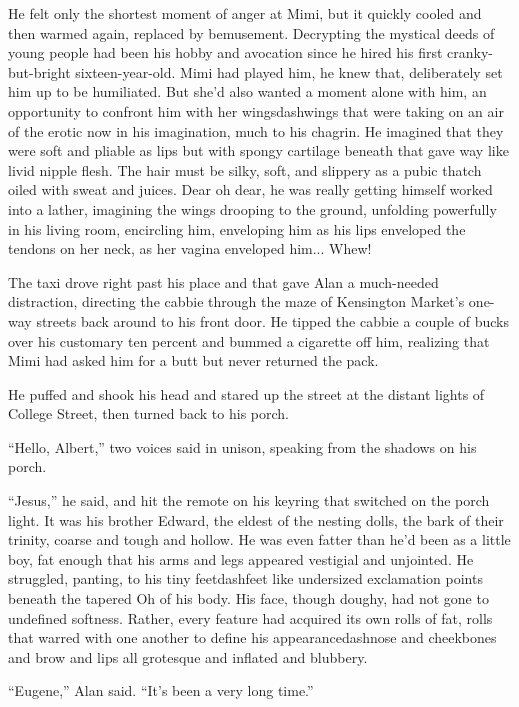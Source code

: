 He felt only the shortest moment of anger at Mimi, but it quickly
cooled and then warmed again, replaced by bemusement.  Decrypting the
mystical deeds of young people had been his hobby and avocation since
he hired his first cranky-but-bright sixteen-year-old.  Mimi had
played him, he knew that, deliberately set him up to be humiliated. 
But she'd also wanted a moment alone with him, an opportunity to
confront him with her wingsdash{}wings that were taking on an air of the
erotic now in his imagination, much to his chagrin.  He imagined that
they were soft and pliable as lips but with spongy cartilage beneath
that gave way like livid nipple flesh.  The hair must be silky, soft,
and slippery as a pubic thatch oiled with sweat and juices.  Dear oh
dear, he was really getting himself worked into a lather, imagining
the wings drooping to the ground, unfolding powerfully in his living
room, encircling him, enveloping him as his lips enveloped the tendons
on her neck, as her vagina enveloped him...  Whew!

The taxi drove right past his place and that gave Alan a much-needed
distraction, directing the cabbie through the maze of Kensington
Market's one-way streets back around to his front door.  He tipped the
cabbie a couple of bucks over his customary ten percent and bummed a
cigarette off him, realizing that Mimi had asked him for a butt but
never returned the pack.

He puffed and shook his head and stared up the street at the distant
lights of College Street, then turned back to his porch.

``Hello, Albert,'' two voices said in unison, speaking from the
shadows on his porch.

``Jesus,'' he said, and hit the remote on his keyring that switched on
the porch light.  It was his brother Edward, the eldest of the nesting
dolls, the bark of their trinity, coarse and tough and hollow.  He was
even fatter than he'd been as a little boy, fat enough that his arms
and legs appeared vestigial and unjointed.  He struggled, panting, to
his tiny feetdash{}feet like undersized exclamation points beneath the
tapered Oh of his body.  His face, though doughy, had not gone to
undefined softness.  Rather, every feature had acquired its own rolls
of fat, rolls that warred with one another to define his
appearancedash{}nose and cheekbones and brow and lips all grotesque and
inflated and blubbery.

``Eugene,'' Alan said.  ``It's been a very long time.''

